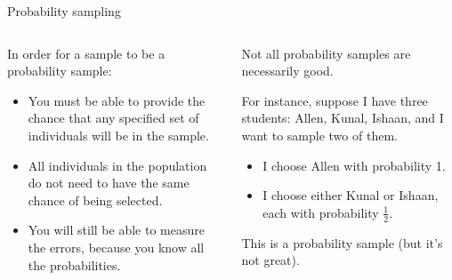\documentclass[aspectratio=169]{../latex_main/tntbeamer}  %
\begin{document}
	
		\begin{frame}{Probability sampling}
	    \begin{columns}
	        \begin{column}{.4\textwidth}
	            In order for a sample to be a probability sample:
	            \begin{itemize}
	                \item You must be able to provide the chance that any specified set of individuals will be in the sample.
	               \item All individuals in the population do not need to have the same chance of being selected.
	                \item You will still be able to measure the errors, because you know all the probabilities.
	            \end{itemize}
	        \end{column}
	        
	        \begin{column}{.5\textwidth}
	            Not all probability samples are necessarily good.
	            \bigskip
             
	            For instance, suppose I have three students: Allen, Kunal, Ishaan, and I want to sample two of them.
	            \begin{itemize}
	                \item I choose Allen with probability 1.
	                \item I choose either Kunal or Ishaan, each with probability $\frac{1}{2}$.
	            \end{itemize}
	            This is a probability sample (but it’s not great).

	        \end{column}
	        
	    \end{columns}
	    
	\end{frame}
	
\end{document}
